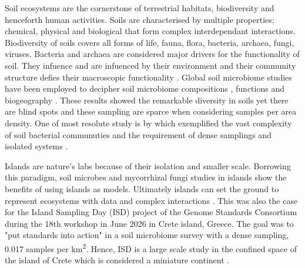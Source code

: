 Soil ecosystems are the cornerstone of terrestrial habitats, biodiversity and henceforth human activities.
Soils are characterised by multiple properties; chemical, physical and biological that 
form complex interdependant interactions. Biodiversity of soils covers
all forms of life, fauna, flora, bacteria, archaea, fungi, viruses. 
Bacteria and archaea are considered major drivers for the functionality of soil.
They infuence and are infuenced by their environment and their community structure 
defies their macroscopic functionality \parencite{Bahram2018}.
Global soil microbiome studies have been employed to decipher soil microbiome
compositions \parencite{thompson2017a-communal, Delgado-Baquerizo-atlas, Labouyrie2023},
functions \parencite{Bahram2018} and biogeography \parencite{Martiny2006, guerra2020Blind}.
These results showed the remarkable diversity in soils yet there are blind spots \parencite{guerra2020Blind}
and these sampling are sparce when considering samples per area density. One of most resolute
study is by \parencite{Karimi2020} which exemplified the 
vast complexity of soil bacterial communuties and the requirement of
dense samplings and isolated systems \parencite{Dini-Andreote2021}.

Islands are nature's labs \parencite{Whittaker2017} because of their isolation and smaller scale.
Borrowing this paradigm, soil microbes \parencite{Li2020} and mycorrhizal fungi \parencite{Delavaux2021} studies
in islands show the benefits of using islands as models. Ultimately islands can
set the ground to represent ecosystems with data and complex interactions \parencite{Davies2016}.
This was also the case for the Island Sampling Day (ISD) project \parencite{holm2024}
of the Genome Standards Consortium \parencite{Field2011}
during the 18th workshop in June 2026 in Crete island, Greece. The goal was to "put standards into action"
in a soil microbiome survey with a dense sampling, 0.017 samples per km\textsuperscript{2}.
Hence, ISD is a large scale study in the confined space of the island of Crete which 
is considered a miniature continent \parencite{Vogiatzakis2008_crete}.

